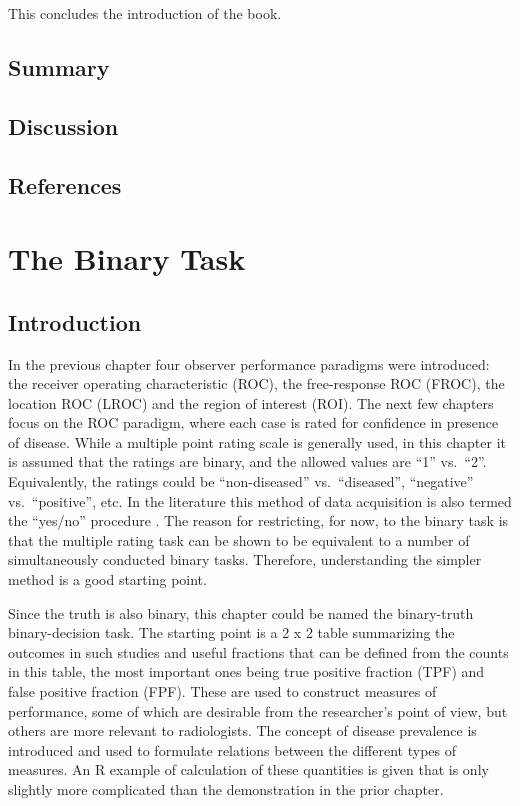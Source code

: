 \documentclass[
]{book}
\begin{document}
This concludes the introduction of the book.

\hypertarget{preliminaries-Summary}{%
\section{Summary}\label{preliminaries-Summary}}

\hypertarget{preliminaries-Discussion}{%
\section{Discussion}\label{preliminaries-Discussion}}

\hypertarget{preliminaries-references}{%
\section{References}\label{preliminaries-references}}

\hypertarget{binaryTask0}{%
\chapter{The Binary Task}\label{binaryTask0}}

\hypertarget{binaryTask0Intro}{%
\section{Introduction}\label{binaryTask0Intro}}

In the previous chapter four observer performance paradigms were introduced: the receiver operating characteristic (ROC), the free-response ROC (FROC), the location ROC (LROC) and the region of interest (ROI). The next few chapters focus on the ROC paradigm, where each case is rated for confidence in presence of disease. While a multiple point rating scale is generally used, in this chapter it is assumed that the ratings are binary, and the allowed values are ``1'' vs.~``2''. Equivalently, the ratings could be ``non-diseased'' vs.~``diseased'', ``negative'' vs.~``positive'', etc. In the literature this method of data acquisition is also termed the ``yes/no'' procedure \citep{RN298, RN346}. The reason for restricting, for now, to the binary task is that the multiple rating task can be shown to be equivalent to a number of simultaneously conducted binary tasks. Therefore, understanding the simpler method is a good starting point.

Since the truth is also binary, this chapter could be named the binary-truth binary-decision task. The starting point is a 2 x 2 table summarizing the outcomes in such studies and useful fractions that can be defined from the counts in this table, the most important ones being true positive fraction (TPF) and false positive fraction (FPF). These are used to construct measures of performance, some of which are desirable from the researcher's point of view, but others are more relevant to radiologists. The concept of disease prevalence is introduced and used to formulate relations between the different types of measures. An R example of calculation of these quantities is given that is only slightly more complicated than the demonstration in the prior chapter.
\end{document}

